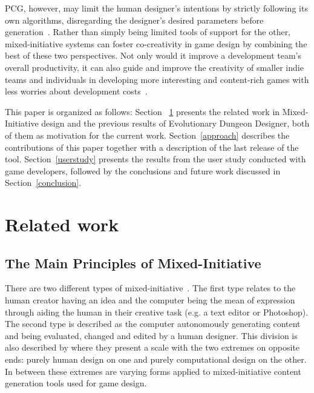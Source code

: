 \documentclass[sigconf]{acmart}
\begin{document}
PCG, however, may limit the human designer’s intentions by strictly following its own algorithms, disregarding the designer’s desired parameters before generation~\cite{yannakakis_mixed-initiative_2014}. Rather than simply being limited tools of support for the other, mixed-initiative systems can foster co-creativity in game design by combining the best of these two perspectives. Not only would it improve a development team’s overall productivity, it can also guide and improve the creativity of smaller indie teams and individuals in developing more interesting and content-rich games with less worries about development costs~\cite{MachadoCiceroSeekWhence,liapis_generating_2013}. 

This paper is organized as follows: Section ~\ref{background} presents the related work in Mixed-Initiative design and the previous results of Evolutionary Dungeon Designer, both of them as motivation for the current work. Section~\ref{approach} describes the contributions of this paper together with a description of the last release of the tool. Section~\ref{userstudy} presents the results from the user study conducted with game developers, followed by the conclusions and future work discussed in Section~\ref{conclusion}.

\section{Related work} \label{background}
\subsection{The Main Principles of Mixed-Initiative}

There are two different types of mixed-initiative~\cite{shaker_procedural_2016}. The first type relates to the human creator having an idea and the computer being the mean of expression through aiding the human in their creative task (e.g. a text editor or Photoshop). The second type is described as the computer autonomously generating content and being evaluated, changed and edited by a human designer. This division is also described by \citet{yannakakis2018artificial} where they present a scale with the two extremes on opposite ends: purely human design on one and purely computational design on the other. In between these extremes are varying forms applied to mixed-initiative content generation tools used for game design. 
\end{document}
